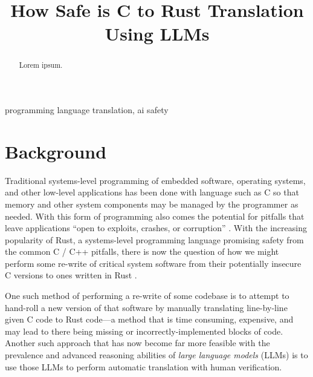 \documentclass[conference]{IEEEtran}
\begin{document}
\title{How Safe is C to Rust Translation Using LLMs}

\author{
\and
{}
}

\maketitle

\begin{abstract}
Lorem ipsum.
\end{abstract}

\begin{IEEEkeywords}
programming language translation, ai safety
\end{IEEEkeywords}

\section{Background}
Traditional systems-level programming of embedded software, operating systems,
and other low-level applications has been done with language such as C so that
memory and other system components may be managed by the programmer as needed.
With this form of programming also comes the potential for pitfalls that leave
applications ``open to exploits, crashes, or corruption'' 
\cite{klabnik2018rust_book}. With the increasing popularity of Rust, a
systems-level programming language promising safety from the common C / C++
pitfalls, there is now the question of how we might perform some re-write of
critical system software from their potentially insecure C versions to ones
written in Rust \cite{klabnik2018rust_book, emre2021translating}.

One such method of performing a re-write of some codebase is to attempt to
hand-roll a new version of that software by manually translating line-by-line
given C code to Rust code---a method that is time consuming, expensive, and
may lead to there being missing or incorrectly-implemented blocks of code.
Another such approach that has now become far more feasible with the
prevalence and advanced reasoning abilities of \textit{large language models}
(LLMs) is to use those LLMs to perform automatic translation with human
verification.
\end{document}
